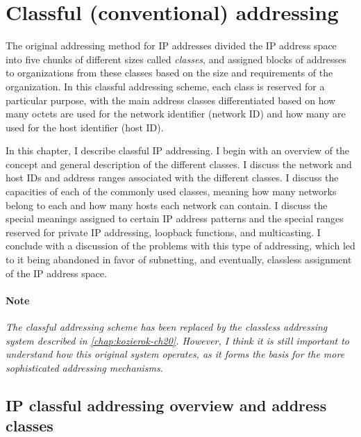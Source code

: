 \chapter{Classful (conventional) addressing}
\label{chap:kozierok-ch17}

The original addressing method for IP addresses divided the IP address
space into five chunks of different sizes called {\emph{classes}}, and
assigned blocks of addresses to organizations from these classes based
on the size and requirements of the organization. In this classful
addressing scheme, each class is reserved for a particular purpose, with
the main address classes differentiated based on how many octets are
used for the network identifier (network ID) and how many are used for
the host identifier (host ID).

In this chapter, I describe classful IP addressing. I begin with an
overview of the concept and general description of the different
classes. I discuss the network and host IDs and address ranges
associated with the different classes. I discuss the capacities of each
of the commonly used classes, meaning how many networks belong to each
and how many hosts each network can contain. I discuss the special
meanings assigned to certain IP address patterns and the special ranges
reserved for private IP addressing, loopback functions, and
multicasting. I conclude with a discussion of the problems with this
type of addressing, which led to it being abandoned in favor of
subnetting, and eventually, classless assignment of the
\protect\hypertarget{ch17.htmlux5cux23idx-CHP-17-0676}{}{}IP address
space.

\subsubsection[Note]{\texorpdfstring{\protect\hypertarget{ch17.htmlux5cux23note-64}{}{}Note}{Note}}

\emph{The classful addressing scheme has been replaced by the classless addressing system described in \vref{chap:kozierok-ch20}.
However, I think it is still important to understand how this original system operates, as it forms the basis for the more sophisticated addressing mechanisms.}



\section{IP classful addressing overview and address classes}

